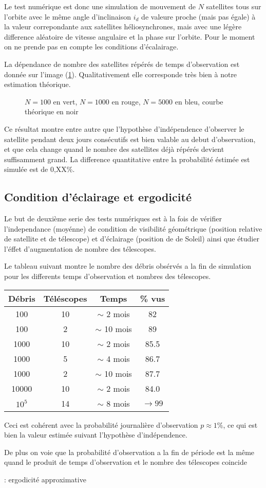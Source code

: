 Le test numérique est donc une simulation de mouvement de $N$ satellites
tous sur l'orbite avec le même angle d'inclinaison $i_d$ de valeure proche (mais pas égale) 
à la valeur correpondante aux satellites héliosynchrones, mais avec une légère difference 
aléatoire de vitesse angulaire et la phase sur l'orbite. Pour le moment on 
ne prende pas en compte les conditions d'écalairage. 

La dépendance de nombre des satellites répérés de temps d'observation
est donnée sur l'image (\ref{proba_obs}). Qualitativement elle corresponde très 
bien à notre estimation théorique. 
 \begin{figure}[htp] \centering
      \caption{
            \label{proba_obs}
  $N = 100$ en vert, $N = 1000$ en rouge, $N = 5000$ en bleu, courbe théorique
  en noir}
 \end{figure}
Ce résultat montre entre autre que l'hypothèse d'indépendence 
d'observer le satellite pendant deux jours consécutifs est 
bien valable au debut d'observation, et que cela change quand
le nombre des satellites déjà répérés devient suffisamment grand.
La difference quantitative entre la probabilité éstimée est simulée
est de 0,XX\%.
  
  
\subsection{Condition d'éclairage et ergodicité}  
Le but de deuxième serie des tests numériques est à la fois de vérifier 
l'independance (moyénne) de condition de visibilité géométrique (position
relative de satellite et de télescope) et d'éclairage (position de
de Soleil) ainsi que étudier l'éffet d'augmentation de nombre des
télescopes. 

Le tableau suivant montre le nombre des débris obsérvés
a la fin de simulation pour les differents temps d'observation et nombres des
télescopes.

\begin{center}
\begin{tabular}{|c|c|c|c|} \hline
 Débris & Téléscopes & Temps & \% vus \\ 
 \hline \hline
 100 & 10 & $\sim$ 2 mois &82 \\
 \hline
 100 & 2 & $\sim$ 10 mois &89 \\
 \hline
 \hline
 1000 & 10 & $\sim$ 2 mois &85.5 \\
 \hline
 1000 & 5 & $\sim$ 4 mois &86.7 \\
 \hline
 1000 & 2 & $\sim$ 10 mois &87.7 \\
 \hline  
 \hline
 10000 & 10 & $\sim$ 2 mois &84.0 \\
 \hline
 \hline
 $10^5$ & 14 & $\sim$ 8 mois & $\to 99$ \\
 \hline
\end{tabular} 
\end{center}
Ceci est cohérent avec la probabilité journalière d'observation 
   $p \approx 1\%$, ce qui est bien la valeur estimée suivant l'hypothèse 
   d'indépendence. 
   
   De plus on voie que la probabilité d'observation a la fin de période
   est la même quand le produit de temps d'observation et le nombre des télescopes
   coincide
   
  : ergodicité approximative






